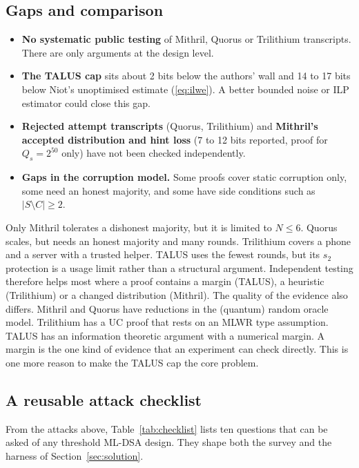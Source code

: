 \documentclass[10pt,conference,a4paper]{IEEEtran}
\begin{document}
\subsection{Gaps and comparison}
\begin{itemize}
\item \textbf{No systematic public testing} of Mithril, Quorus or Trilithium transcripts. There are only arguments at the
design level.
\item \textbf{The TALUS cap} sits about 2 bits below the authors' wall and 14 to 17 bits below Niot's unoptimised
estimate (\ref{eq:ilwe}). A better bounded noise or ILP estimator could close this gap.
\item \textbf{Rejected attempt transcripts} (Quorus, Trilithium) and \textbf{Mithril's accepted distribution and hint loss}
(7 to 12 bits reported, proof for $Q_s=2^{50}$ only) have not been checked independently.
\item \textbf{Gaps in the corruption model.} Some proofs cover static corruption only, some need an honest majority, and
some have side conditions such as $|S\setminus C|\ge2$.
\end{itemize}
Only Mithril tolerates a dishonest majority, but it is limited to $N\le6$. Quorus scales, but needs an honest majority and
many rounds. Trilithium covers a phone and a server with a trusted helper. TALUS uses the fewest rounds, but its $s_2$
protection is a usage limit rather than a structural argument. Independent testing therefore helps most where a proof
contains a margin (TALUS), a heuristic (Trilithium) or a changed distribution (Mithril). The quality of the evidence also
differs. Mithril and Quorus have reductions in the (quantum) random oracle model. Trilithium has a UC proof that rests on an
MLWR type assumption. TALUS has an information theoretic argument with a numerical margin. A margin is the one kind of
evidence that an experiment can check directly. This is one more reason to make the TALUS cap the core problem.

\subsection{A reusable attack checklist}
From the attacks above, Table~\ref{tab:checklist} lists ten questions that can be asked of any threshold ML-DSA design.
They shape both the survey and the harness of Section~\ref{sec:solution}.
\end{document}
